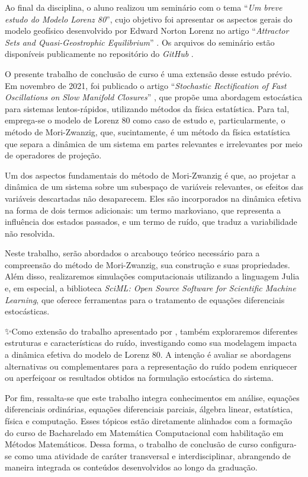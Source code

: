 \documentclass[12pt]{article}
\begin{document}
Ao final da disciplina, o aluno realizou um seminário com o tema ``\textit{Um breve estudo do Modelo Lorenz 80}'', cujo objetivo foi apresentar os aspectos gerais do modelo geofísico desenvolvido por Edward Norton Lorenz no artigo ``\textit{Attractor Sets and Quasi-Geostrophic Equilibrium}'' \citep{Lorenz1980}. Os arquivos do seminário estão disponíveis publicamente no repositório do \textit{GitHub} \citep{TaylorL80}.

O presente trabalho de conclusão de curso é uma extensão desse estudo prévio. Em novembro de 2021, foi publicado o artigo ``\textit{Stochastic Rectification of Fast Oscillations on Slow Manifold Closures}'' \citep{Chekroun2021}, que propõe uma abordagem estocástica para sistemas lentos-rápidos, utilizando métodos da física estatística. Para tal, emprega-se o modelo de Lorenz 80 como caso de estudo e, particularmente, o método de Mori-Zwanzig, que, sucintamente, é um método da física estatística que separa a dinâmica de um sistema em partes relevantes e irrelevantes por meio de operadores de projeção.

Um dos aspectos fundamentais do método de Mori-Zwanzig é que, ao projetar a dinâmica de um sistema sobre um subespaço de variáveis relevantes, os efeitos das variáveis descartadas não desaparecem. Eles são incorporados na dinâmica efetiva na forma de dois termos adicionais: um termo markoviano, que representa a influência dos estados passados, e um termo de ruído, que traduz a variabilidade não resolvida. 

Neste trabalho, serão abordados o arcabouço teórico necessário para a compreensão do método de Mori-Zwanzig, sua construção e suas propriedades. Além disso, realizaremos simulações computacionais utilizando a linguagem Julia e, em especial, a biblioteca \textit{SciML: Open Source Software for Scientific Machine Learning}, que oferece ferramentas para o tratamento de equações diferenciais estocásticas. 

✨Como extensão do trabalho apresentado por \citet{Chekroun2021}, também exploraremos diferentes estruturas e características do ruído, investigando como sua modelagem impacta a dinâmica efetiva do modelo de Lorenz 80. A intenção é avaliar se abordagens alternativas ou complementares para a representação do ruído podem enriquecer ou aperfeiçoar os resultados obtidos na formulação estocástica do sistema.

Por fim, ressalta-se que este trabalho integra conhecimentos em análise, equações diferenciais ordinárias, equações diferenciais parciais, álgebra linear, estatística, física e computação. Esses tópicos estão diretamente alinhados com a formação do curso de Bacharelado em Matemática Computacional com habilitação em Métodos Matemáticos. Dessa forma, o trabalho de conclusão de curso configura-se como uma atividade de caráter transversal e interdisciplinar, abrangendo de maneira integrada os conteúdos desenvolvidos ao longo da graduação.
\end{document}
